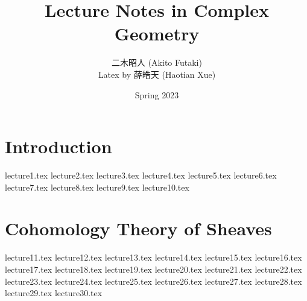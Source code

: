 \documentclass[twoside,12pt]{book}
\title{\Huge Lecture Notes in Complex Geometry}
\author{{\Large 二木昭人} (Akito Futaki)\\
Latex by 薛皓天 (Haotian Xue)}
\date{\Large Spring 2023}
\begin{document}
\maketitle
\frontmatter
\tableofcontents
\newpage
\mainmatter{}

\chapter{Introduction}
{lecture1.tex}
{lecture2.tex}
{lecture3.tex}
{lecture4.tex}
{lecture5.tex}
{lecture6.tex}
{lecture7.tex}
{lecture8.tex}
{lecture9.tex}
{lecture10.tex}
\chapter{Cohomology Theory of Sheaves}
{lecture11.tex}
{lecture12.tex}
{lecture13.tex}
{lecture14.tex}
{lecture15.tex}
{lecture16.tex}
{lecture17.tex}
{lecture18.tex}
{lecture19.tex}
{lecture20.tex}
{lecture21.tex}
{lecture22.tex}
{lecture23.tex}
{lecture24.tex}
{lecture25.tex}
{lecture26.tex}
{lecture27.tex}
{lecture28.tex}
{lecture29.tex}
{lecture30.tex}
\end{document}
